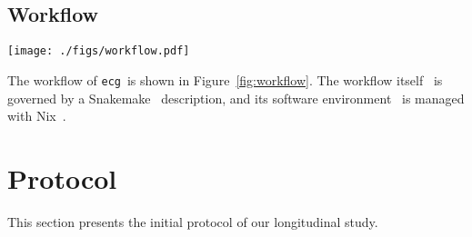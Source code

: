 \documentclass[sigconf,natbib=false]{acmart}
\newcommand{\df}{\texttt{Dockerfile}}
\newcommand{\ecg}{\texttt{ecg}}
\newcommand{\todo}[1]{{\color{red}{TODO: #1}}}
\begin{document}
\subsection{Workflow}\label{sec:workflow}

\begin{figure*}
  \centering
  \texttt{[image: ./figs/workflow.pdf]}
  \caption{
    Workflow of \ecg.
    Each description of an artifact is verified with the Nickel contract and then converted in a JSON representation.
    This JSON representation is then read by \ecg\ to
    download the artifact,
    compute the hash of its content,
    build the container from the \df, and
    extract the software environment information from the built container.
    \ecg\ outputs files containing the information about the artifact and its \df\ .
  }
  \label{fig:workflow}
\end{figure*}

The workflow of \ecg\ is shown in Figure~\ref{fig:workflow}.
The workflow itself~\cite{ecg_workflow} is governed by a Snakemake~\cite{koster2012snakemake} description, and its software environment~\cite{ecg_nix} is managed with Nix~\cite{dolstra_nix_2004}.

% 

\section{Protocol}\label{sec:protocol}

This section presents the initial protocol of our longitudinal study.
\end{document}

